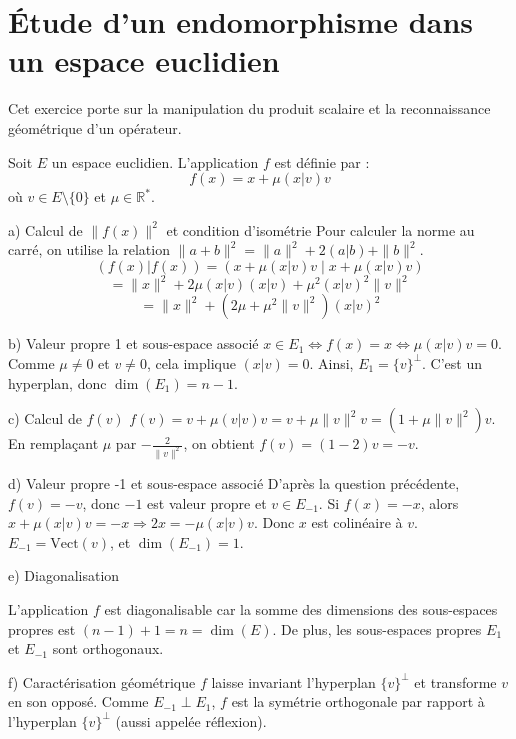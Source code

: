 \documentclass[french]{yLectureNote}
\begin{document}
\section{Étude d'un endomorphisme dans un espace euclidien}

Cet exercice porte sur la manipulation du produit scalaire et la reconnaissance géométrique d'un opérateur.

\begin{definition}
Soit $E$ un espace euclidien. L'application $f$ est définie par :
$$f(x) = x + \mu (x|v)v$$
où $v \in E \setminus \{0\}$ et $\mu \in \mathbb{R}^*$.
\end{definition}


a) Calcul de $\|f(x)\|^2$ et condition d'isométrie
Pour calculer la norme au carré, on utilise la relation $\|a+b\|^2 = \|a\|^2 + 2(a|b) + \|b\|^2$.
$$(f(x)|f(x)) = (x + \mu(x|v)v \mid x + \mu(x|v)v)$$
$$= \|x\|^2 + 2\mu(x|v)(x|v) + \mu^2(x|v)^2\|v\|^2$$
$$= \|x\|^2 + (2\mu + \mu^2\|v\|^2)(x|v)^2$$


b) Valeur propre 1 et sous-espace associé
$x \in E_1 \iff f(x) = x \iff \mu(x|v)v = 0$. Comme $\mu \neq 0$ et $v \neq 0$, cela implique $(x|v) = 0$.
Ainsi, $E_1 = \{v\}^\perp$. C'est un hyperplan, donc $\dim(E_1) = n-1$.

c) Calcul de $f(v)$
$f(v) = v + \mu(v|v)v = v + \mu\|v\|^2 v = (1 + \mu\|v\|^2)v$.
En remplaçant $\mu$ par $-\frac{2}{\|v\|^2}$, on obtient $f(v) = (1 - 2)v = -v$.

d) Valeur propre -1 et sous-espace associé
D'après la question précédente, $f(v) = -v$, donc $-1$ est valeur propre et $v \in E_{-1}$.
Si $f(x) = -x$, alors $x + \mu(x|v)v = -x \Rightarrow 2x = -\mu(x|v)v$. Donc $x$ est colinéaire à $v$.
$E_{-1} = \text{Vect}(v)$, et $\dim(E_{-1}) = 1$.

e) Diagonalisation
\begin{proposition}
L'application $f$ est diagonalisable car la somme des dimensions des sous-espaces propres est $(n-1) + 1 = n = \dim(E)$. De plus, les sous-espaces propres $E_1$ et $E_{-1}$ sont orthogonaux.
\end{proposition}

f) Caractérisation géométrique
$f$ laisse invariant l'hyperplan $\{v\}^\perp$ et transforme $v$ en son opposé. Comme $E_{-1} \perp E_1$, $f$ est la symétrie orthogonale par rapport à l'hyperplan $\{v\}^\perp$ (aussi appelée réflexion).
\end{document}
